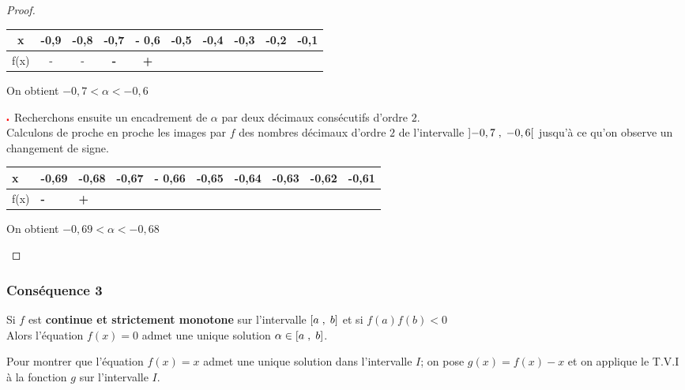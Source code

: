\begin{proof}
\begin{enumerate}
\renewcommand{\arraystretch}{1}
\begin{tabular}{|*{10}{c|}}
\hline 
x &-0,9  &-0,8 & -0,7 &- 0,6 & -0,5 & -0,4 &-0,3 &-0,2& -0,1  \\
\hline
f(x) &-  & -  & \textbf{\color{red} -} & \textbf{\color{red} +}  & \color{green} &  &  &  &  \\
\hline
\end{tabular}

\vspace{0.5cm}   On obtient $-0,7<\alpha< - 0,6  $


$ \color{red}\centerdot $ Recherchons ensuite  un encadrement de $ \alpha $ par deux décimaux consécutifs d'ordre $ 2. $\\
Calculons de proche en proche les images par $ f $  des nombres décimaux d'ordre $ 2 $ de l'intervalle $ \left]-0,7 \;,\; -0,6\right[ $ jusqu'à ce qu'on observe un changement de signe.

\begin{center}
\begin{tabularx}{\textwidth}{|X|X|X|X|X|X|X|X|X|X|}
\hline 
x &-0,69  &-0,68 & -0,67 &- 0,66 & -0,65 & -0,64 &-0,63 &-0,62& -0,61  \\
\hline
f(x) &\textbf{\color{red} -} & \textbf{\color{red} +}  &  &   & \color{green} &  &  &  &  \\
\hline
\end{tabularx}

\vspace{0.5cm}   On obtient $-0,69<\alpha< - 0,68  $

\end{center}
\end{enumerate}
  \end{proof}
  \subsubsection*{Conséquence 3}
  
 Si $ f $ est \textbf{\color{magenta}continue et strictement monotone} sur  l'intervalle $ \left[a\;,\; b\right] $ et si \colorbox{green!20!}{$ f(a)f(b) < 0 $ }\\
Alors l'équation $ f(x)=0 $ admet une  unique  solution $ \alpha \in \left[a\;,\; b\right] $.

\begin{remark}
Pour montrer que l'équation $ f(x)=x $ admet une  unique  solution dans l'intervalle $I$; on pose $ g(x)=f(x)-x $ et on applique le T.V.I à la fonction $ g $ sur l'intervalle $I$.
\end{remark}

